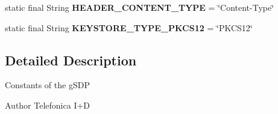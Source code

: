 \begin{DoxyCompactItemize}
\item 
\hypertarget{classcom_1_1bluevia_1_1commons_1_1GsdpConstants_afa2545990dd642b2eee745b06d20aa54}{
static final String {\bfseries HEADER\_\-CONTENT\_\-TYPE} = \char`\"{}Content-\/Type\char`\"{}}
\label{classcom_1_1bluevia_1_1commons_1_1GsdpConstants_afa2545990dd642b2eee745b06d20aa54}

\item 
\hypertarget{classcom_1_1bluevia_1_1commons_1_1GsdpConstants_a09108a6e8d92349b97ddba6dd00687f6}{
static final String {\bfseries KEYSTORE\_\-TYPE\_\-PKCS12} = \char`\"{}PKCS12\char`\"{}}
\label{classcom_1_1bluevia_1_1commons_1_1GsdpConstants_a09108a6e8d92349b97ddba6dd00687f6}

\end{DoxyCompactItemize}


\subsection{Detailed Description}
Constants of the gSDP

\begin{DoxyAuthor}{Author}
Telefonica I+D 
\end{DoxyAuthor}
